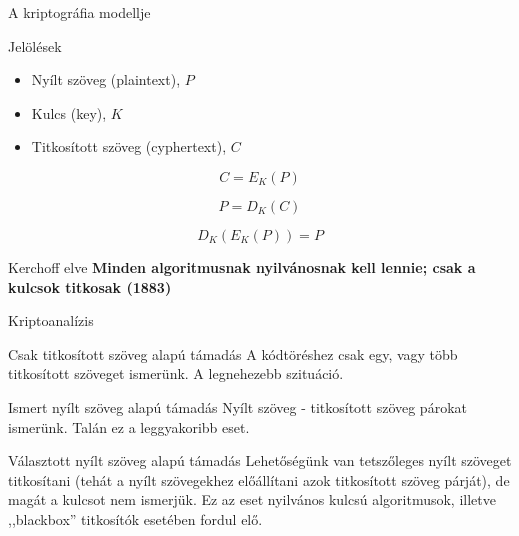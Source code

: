 \documentclass[12 pt]{beamer}
\begin{document}
\begin{frame}{A kriptográfia modellje}

  \begin{block}{Jelölések}
    \begin{itemize}
      \item{Nyílt szöveg (plaintext), $P$}
      \item{Kulcs (key), $K$}
      \item{Titkosított szöveg (cyphertext), $C$}
    \end{itemize}
  \end{block}

  \[C = E_K(P)\]

  \[P = D_K(C)\]

  \[D_K(E_K(P)) = P\]
  
  \begin{block}{Kerchoff elve}
    \textbf{Minden algoritmusnak nyilvánosnak kell lennie; csak a kulcsok titkosak (1883)}
  \end{block}

\end{frame}
    

\begin{frame}{Kriptoanalízis}
  \begin{block}{Csak titkosított szöveg alapú támadás}
    A kódtöréshez csak egy, vagy több titkosított szöveget ismerünk. A legnehezebb szituáció.
  \end{block}

  \begin{block}{Ismert nyílt szöveg alapú támadás}
    Nyílt szöveg - titkosított szöveg párokat ismerünk. Talán ez a leggyakoribb eset.
  \end{block}

  \begin{block}{Választott nyílt szöveg alapú támadás}
    Lehetőségünk van tetszőleges nyílt szöveget titkosítani (tehát a nyílt szövegekhez előállítani azok titkosított szöveg párját), de magát a kulcsot nem ismerjük. Ez az eset nyilvános kulcsú algoritmusok, illetve ,,blackbox'' titkosítók esetében fordul elő.
  \end{block}
\end{frame}

\end{document}
